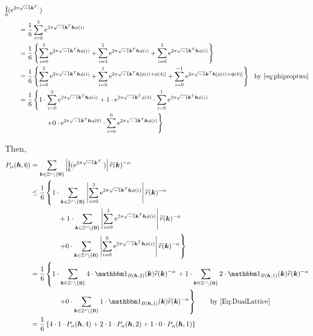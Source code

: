 \documentclass{amsart}
\newcommand{\tr}{\widetilde{r}}
\DeclareMathOperator{\appxint}{\hat{I}}
\begin{document}
\begin{align*}
   \MoveEqLeft{\appxint_{6}(\me^{2 \pi \sqrt{-1} \vk^T \cdot})}\\
    &= \frac 1{6} \sum_{i=0}^{5} \me^{2 \pi \sqrt{-1} \vk^T \vh\phi(i)} \\
    &= \frac {1}{6} \left\{ \sum_{i=0}^3 \me^{2 \pi \sqrt{-1} \vk^T \vh\phi(i)} + \sum_{i=4}^5 \me^{2 \pi \sqrt{-1} \vk^T \vh\phi(i)} + \sum_{i=6}^5 \me^{2 \pi \sqrt{-1} \vk^T \vh\phi(i)}  \right\} \\
    &= \frac {1}{6} \left\{ \sum_{i=0}^3 \me^{2 \pi \sqrt{-1} \vk^T \vh\phi(i)} + \sum_{i=0}^1 \me^{2 \pi \sqrt{-1} \vk^T \vh[\phi(i)+\phi(4)]} + \sum_{i=0}^{-1} \me^{2 \pi \sqrt{-1} \vk^T \vh[\phi(i)+\vphi(6)]}  \right\} \ \ \text{by \eqref{eq:phiproptwo}} \\
    &= \frac {1}{6} \left\{ 1\cdot\sum_{i=0}^{3}\me^{2 \pi \sqrt{-1} \vk^T \vh\phi(i)} + 1 \cdot \me^{2 \pi \sqrt{-1} \vk^T \phi(4)} \cdot \sum_{i=0}^{1}\me^{2 \pi \sqrt{-1} \vk^T \vh\phi(i)} \right . \\
    & \qquad \qquad \left . +  0 \cdot 
    \me^{2 \pi \sqrt{-1} \vk^T \vh\phi(6)} \cdot \sum_{i=0}^{0}\me^{2 \pi \sqrt{-1} \vk^T \vh\phi(i)} \right\}
\end{align*}
 
 Then,
\begin{align*}
    P_\alpha(\vh,6) & = \sum_{\vk \in \integers^s \setminus\{\vzero\}}
    \abs{\appxint_6(\me^{2 \pi \sqrt{-1} \vk^T \cdot})}\tr(\vk)^{-\alpha}
    \\
    & \le 
    \frac {1}{6} \left\{ 1\cdot\sum_{\vk \in \integers^s \setminus\{\vzero\}} \abs{\sum_{i=0}^{3}\me^{2 \pi \sqrt{-1} \vk^T \vh\phi(i)}} \tr(\vk)^{-\alpha}  \right .
    \\ 
    & \qquad \qquad + 1  \cdot \sum_{\vk \in \integers^s \setminus\{\vzero\}} \abs{\sum_{i=0}^{1}\me^{2 \pi \sqrt{-1} \vk^T \vh\phi(i)}} \tr(\vk)^{-\alpha}  \\
    & \qquad \qquad \left . +  0  
    \cdot \sum_{\vk \in \integers^s \setminus\{\vzero\}} \abs{\sum_{i=0}^{0}\me^{2 \pi \sqrt{-1} \vk^T \vh\phi(i)}}  \tr(\vk)^{-\alpha} \right\}\\
    & =
    \frac {1}{6} \left\{ 1\cdot\sum_{\vk \in \integers^s \setminus\{\vzero\}} 4 \cdot \bbone_{B(\vh,2)}(\vk) \tr(\vk)^{-\alpha}  \right .
    + 1  \cdot \sum_{\vk \in \integers^s \setminus\{\vzero\}}2 \cdot \bbone_{B(\vh,1)}(\vk) \tr(\vk)^{-\alpha}  \\
    & \qquad \qquad \left . +  0  
    \cdot \sum_{\vk \in \integers^s \setminus\{\vzero\}} 1 \cdot \bbone_{B(\vh,1)}(\vk)  \tr(\vk)^{-\alpha} \right\} \qquad \text{by \eqref{Eq:DualLattice}}\\
    & = \frac {1}{6} \left\{ 4 \cdot 1 \cdot P_\alpha(\vh,4)+ 2 \cdot 1 \cdot P_\alpha(\vh,2)+ 1 \cdot 0 \cdot P_\alpha(\vh,1) \right\} \\
\end{align*}
\end{document}

